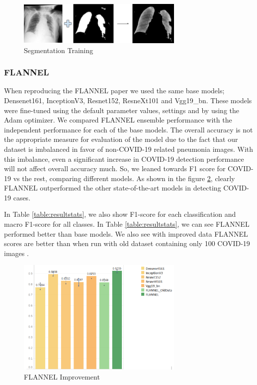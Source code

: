 \documentclass{sigkddExp}
\begin{document}
\begin{figure}[h]
    \includegraphics[width=8cm]{../doc/images/segmentation_training.png}
    \caption{Segmentation Training}
    \label{fig:segtrain}
\end{figure}

\subsubsection{FLANNEL}

When reproducing the FLANNEL paper we used the same base models;  Densenet161,
InceptionV3, Resnet152, ResneXt101 and Vgg19\_bn. These models were fine-tuned
using the default parameter values, settings and by using the Adam optimizer. We
compared FLANNEL ensemble performance with the independent performance for each
of the base models. The overall accuracy is not the appropriate measure for
evaluation of the model due to the fact that our dataset is imbalanced in favor
of non-COVID-19 related pneumonia images. With this imbalance, even a
significant increase in COVID-19 detection performance will not affect overall
accuracy much. So, we leaned towards F1 score for COVID-19 vs the rest,
comparing different models. As shown in the figure \ref{fig:f1score}, clearly
FLANNEL outperformed the other state-of-the-art models in detecting COVID-19
cases.

In Table \ref{table:resultstats}, we also show F1-score for each classification
and macro F1-score for all classes. In Table \ref{table:resultstats}, we can see
FLANNEL performed better than base models. We also see with improved data FLANNEL
scores are better than when run with old dataset containing only 100 COVID-19 images
\cite{10.1093/jamia/ocaa280}.


\begin{figure}[H]
    \includegraphics[width=8cm]{../doc/images/F1Score_vs_rest.png}
    \caption{FLANNEL Improvement}
    \label{fig:f1score}
\end{figure}
\end{document}
